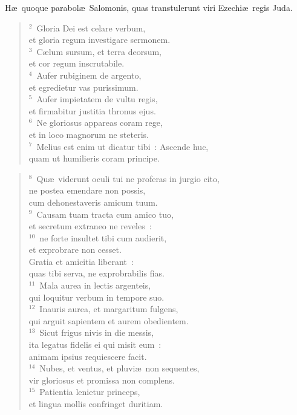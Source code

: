 \bchapter
\lettrine[lines=3,image=true,loversize=0.05,lraise=-0.03]{H}{}\ae\ quoque parabol\ae\ Salomonis, quas transtulerunt viri Ezechi\ae\ regis Juda.
\begin{flushleft}\begin{verse}\vspace{6pt}${}^{2}$~Gloria Dei est celare verbum,\\ et gloria regum investigare sermonem.\\
${}^{3}$~C\ae lum sursum, et terra deorsum,\\ et cor regum inscrutabile.\\
${}^{4}$~Aufer rubiginem de argento,\\ et egredietur vas purissimum.\\
${}^{5}$~Aufer impietatem de vultu regis,\\ et firmabitur justitia thronus ejus.\\
${}^{6}$~Ne gloriosus appareas coram rege,\\ et in loco magnorum ne steteris.\\
${}^{7}$~Melius est enim ut dicatur tibi~: Ascende huc,\\ quam ut humilieris coram principe.\end{verse}\end{flushleft}


\begin{flushleft}\begin{verse}${}^{8}$~Qu\ae\ viderunt oculi tui ne proferas in jurgio cito,\\ ne postea emendare non possis,\\ cum dehonestaveris amicum tuum.\\
${}^{9}$~Causam tuam tracta cum amico tuo,\\ et secretum extraneo ne reveles~:\\
${}^{10}$~ne forte insultet tibi cum audierit,\\ et exprobrare non cesset.\\ Gratia et amicitia liberant~:\\ quas tibi serva, ne exprobrabilis fias.\\
${}^{11}$~Mala aurea in lectis argenteis,\\ qui loquitur verbum in tempore suo.\\
${}^{12}$~Inauris aurea, et margaritum fulgens,\\ qui arguit sapientem et aurem obedientem.\\
${}^{13}$~Sicut frigus nivis in die messis,\\ ita legatus fidelis ei qui misit eum~:\\ animam ipsius requiescere facit.\\
${}^{14}$~Nubes, et ventus, et pluvi\ae\ non sequentes,\\ vir gloriosus et promissa non complens.\\
${}^{15}$~Patientia lenietur princeps,\\ et lingua mollis confringet duritiam.\end{verse}\end{flushleft}


